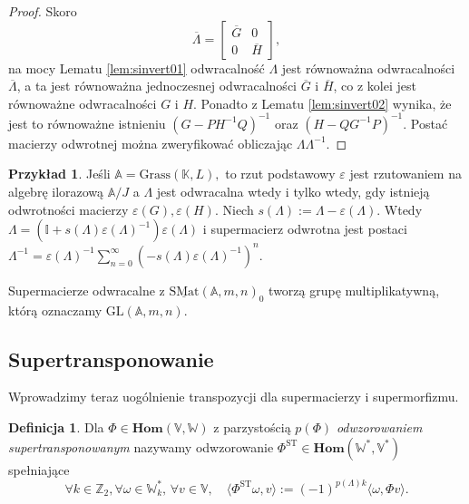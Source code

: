 \documentclass[11pt,a4paper]{report}
\theoremstyle{definition}
\newtheorem{example}[theorem]{Przykład}
\newtheorem{definition}[theorem]{Definicja}
\newcommand{\I}{\mathbb{I}}
\begin{document}
\begin{proof}
  Skoro $$\overline{\Lambda} = \begin{bmatrix}
      \overline{G} & 0 \\
      0 & \overline{H}
     \end{bmatrix},$$ na mocy Lematu \ref{lem:sinvert01} odwracalność $\Lambda$ jest równoważna odwracalności $\overline{\Lambda}$, a ta jest równoważna jednoczesnej odwracalności $\overline{G}$ i $\overline{H}$, co z kolei jest równoważne odwracalności $G$ i $H$. Ponadto z Lematu \ref{lem:sinvert02} wynika, że jest to równoważne istnieniu $(G-PH^{-1}Q)^{-1}$ oraz $(H-QG^{-1}P)^{-1}$. Postać macierzy odwrotnej można zweryfikować obliczając $\Lambda \Lambda^{-1}$.
\end{proof}

\begin{example}
Jeśli $\mathbb{A} = \mathrm{Grass}(\mathbb{K}, L),$ to rzut podstawowy $\varepsilon$ jest rzutowaniem na algebrę ilorazową $\mathbb{A} / J$ a $\Lambda$ jest odwracalna wtedy i tylko wtedy, gdy istnieją odwrotności macierzy $\varepsilon(G), \varepsilon(H)$. Niech $s(\Lambda) := \Lambda - \varepsilon(\Lambda)$. Wtedy $\Lambda = (\I +s(\Lambda) \varepsilon(\Lambda)^{-1}) \varepsilon(\Lambda)$ i supermacierz odwrotna jest postaci $\Lambda^{-1} = \varepsilon(\Lambda)^{-1} \sum_{n=0}^{\infty} (-s(\Lambda) \varepsilon(\Lambda)^{-1})^{n}$.
\end{example}

Supermacierze odwracalne z $\underline{\mathrm{SMat}}(\mathbb{A},m,n)_0$ tworzą grupę multiplikatywną, którą oznaczamy $\mathrm{GL}(\mathbb{A},m,n).$

\subsection{Supertransponowanie}

Wprowadzimy teraz uogólnienie transpozycji dla supermacierzy i supermorfizmu.

\begin{definition}
Dla $\Phi \in \mathbf{Hom}(\mathbb{V},\mathbb{W})$ z parzystością $p(\Phi)$ \textit{odwzorowaniem supertransponowanym} nazywamy odwzorowanie $\Phi^\mathrm{ST} \in \mathbf{Hom}(\mathbb{W}^*,\mathbb{V}^*)$ spełniające
 \begin{equation}
  \label{supertransposed_morphism}
   \forall k \in \mathbb{Z}_2, \forall \omega \in \mathbb{W}^*_k,\, \forall v \in \mathbb{V}, \quad \langle \Phi^{\mathrm{ST}} \omega , v \rangle := (-1)^{p(\Lambda)k} \langle \omega , \Phi v \rangle.
 \end{equation}
\end{definition}
\end{document}
